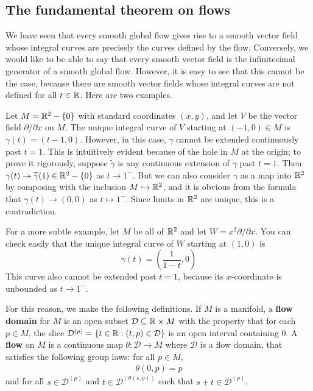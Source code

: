 \subsection{The fundamental theorem on flows}
We have seen that every smooth global flow gives rise to a smooth vector field whose integral curves are precisely the curves defined by the flow. Conversely, we would like to be able to say that every smooth vector field is the infinitesimal generator of a smooth global flow. However, it is easy to see that this cannot be the case, because there are smooth vector fields whose integral curves are not defined for all $t\in\mathbb{R}$. Here are two examples.
\begin{example}
Let $M=\mathbb{R}^2-\{0\}$ with standard coordinates $(x,y)$, and let $V$ be the vector field $\partial/\partial x$ on $M$. The unique integral curve of $V$ starting at $(-1,0)\in M$ is $\gamma(t)=(t-1,0)$. However, in this case, $\gamma$ cannot be extended continuously past $t=1$. This is intuitively evident because of the hole in $M$ at the origin; to prove it rigorously, suppose $\widetilde{\gamma}$ is any continuous extension of $\gamma$ past $t=1$. Then $\gamma(t)\to\widetilde{\gamma}(1)\in\mathbb{R}^2-\{0\}$ as $t\to 1^-$. But we can also consider $\gamma$ as a map into $\mathbb{R}^2$ by composing with the inclusion $M\hookrightarrow\mathbb{R}^2$, and it is obvious from the formula that $\gamma(t)\to(0,0)$ as $t\mapsto 1^-$. Since limits in $\mathbb{R}^2$ are unique, this is a contradiction.
\end{example}
\begin{example}
For a more subtle example, let $M$ be all of $\mathbb{R}^2$ and let $W=x^2\partial/\partial x$. You can check easily that the unique integral curve of $W$ starting at $(1,0)$ is
\[\gamma(t)=(\frac{1}{1-t},0)\]
This curve also cannot be extended past $t=1$, because its $x$-coordinate is unbounded as $t\to 1^-$.
\end{example}
For this reason, we make the following definitions. If $M$ is a manifold, a \textbf{flow domain} for $M$ is an open subset $\mathcal{D}\subseteq\mathbb{R}\times M$ with the property that for each $p\in M$, the slice $\mathcal{D}^{(p)}=\{t\in\mathbb{R}:(t,p)\in\mathcal{D}\}$ is an open interval containing $0$. A \textbf{flow} on $M$ is a continuous map $\theta:\mathcal{D}\to M$ where $\mathcal{D}$ is a flow domain, that satisfies the following group laws: for all $p\in M$,
\begin{align}\label{group law-1}
\theta(0,p)=p
\end{align}
and for all $s\in\mathcal{D}^{(p)}$ and $t\in\mathcal{D}^{(\theta(s,p))}$ such that $s+t\in\mathcal{D}^{(p)}$,

